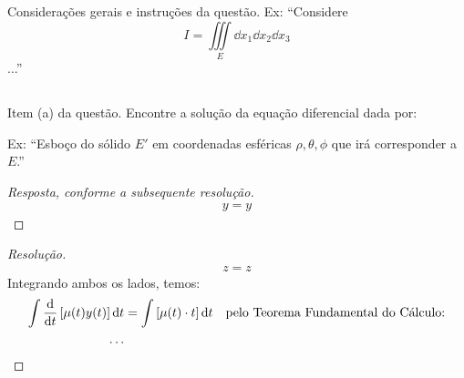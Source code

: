\documentclass[12pt, a4paper]{article}
\newenvironment{resposta}
  {\renewcommand\qedsymbol{$\blacksquare$}\begin{proof}[Resposta, conforme a subsequente resolução]}
  {\end{proof}}
\newenvironment{resolucao}
  {\renewcommand\qedsymbol{$\blacksquare$}\begin{proof}[Resolução]}
  {\end{proof}}
\begin{document}
\newcommand{\EXEMPLOITEMa}
{Encontre a solução da equação diferencial dada por:
}

% 
\section{} %
Considerações gerais e instruções da questão. Ex: ``Considere $$I = \iiint\limits_E \dd{x_1} \dd{x_2} \dd{x_3}$$...''

\subsection{} %
Item (a) da questão. \EXEMPLOITEMa
Ex: ``Esboço do sólido  $E'$ em coordenadas esféricas $\rho, \theta, \phi$ que irá corresponder a $E$.''

\begin{resposta}
  \begin{align*}
    y=y
  \end{align*}
\end{resposta}

\begin{resolucao}
  \begin{align}
    z=z
    \label{q2}
  \end{align}
  Integrando ambos os lados, temos:
  \begin{align*}
    \int{ \dv{}{t} \left[\mu(t)y(t)\right] \dd{t} } & = \int{ [\mu(t) \cdot t] \dd{t} }
                                                    &                                   & \text{pelo Teorema Fundamental do Cálculo:} \\
    \dots
  \end{align*}
\end{resolucao}


\end{document}
